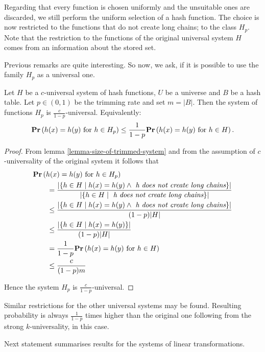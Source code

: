 Regarding that every function is chosen uniformly and the unsuitable ones are discarded, we still perform the uniform selection of a hash function. The choice is now restricted to the functions that do not create long chains; to the class $H_p$. Note that the restriction to the functions of the original universal system $H$ comes from an information about the stored set.

Previous remarks are quite interesting. So now, we ask, if it is possible to use the family $H_p$ as a universal one.
\begin{theorem}
\label{theorem-p-trimmed-is-universal}
Let $H$ be a $c$-universal system of hash functions, $U$ be a universe and $B$ be a hash table. Let $p \in (0, 1)$ be the trimming rate and set $m = |B|$. Then the system of functions $H_p$ is $\frac{c}{1 - p}$-universal. Equivalently:
\[
	\mathbf{Pr}\left(h(x) = h(y) \text{ for } h \in H_p\right) \leq \frac{1}{1 - p} \mathbf{Pr}\left(h(x) = h(y) \text{ for } h \in H\right) \text{.}
\]
\end{theorem}
\begin{proof}
From lemma \ref{lemma-size-of-trimmed-system} and from the assumption of $c$-universality of the original system it follows that 
\[
\begin{split}
& \mathbf{Pr}\left(h(x) = h(y) \text{ for } h \in H_p\right)  \\
	& \qquad =  \frac{|\{ h \in H \mid h(x) = h(y) \wedge \textit{ h does not create long chains} \}|}{|\lbrace h \in H \mid \textit{ h does not create long chains} \rbrace|} \\
	& \qquad \leq \frac{|\{ h \in H \mid h(x) = h(y) \wedge \textit{ h does not create long chains} \}|}{(1 - p)|H|} \\ 
	& \qquad \leq \frac{|\{ h \in H \mid h(x) = h(y) \}|}{(1 - p)|H|} \\
	& \qquad = \frac{1}{1 - p} \mathbf{Pr}\left(h(x) = h(y) \text{ for } h \in H\right) \\
	& \qquad \leq \frac{c}{(1 - p) m} \\
\end{split}
\]

Hence the system $H_p$ is $\frac{c}{1 - p}$-universal.
\end{proof}

Similar restrictions for the other universal systems may be found. Resulting probability is always $\frac{1}{1 - p}$ times higher than the original one following from the strong $k$-universality, in this case.

Next statement summarises results for the systems of linear transformations.

